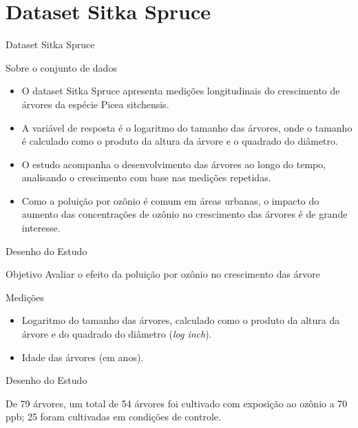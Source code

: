 \section{Dataset Sitka Spruce}
\begin{frame}{Dataset Sitka Spruce}
	\begin{block}{Sobre o conjunto de dados}
		\begin{itemize}
			\justifying
			\item O dataset Sitka Spruce apresenta medições longitudinais do crescimento de árvores da espécie Picea sitchensis.
			\item A variável de resposta é o logaritmo do tamanho das árvores, onde o tamanho é calculado como o produto da altura da árvore e o quadrado do diâmetro.
			\item O estudo acompanha o desenvolvimento das árvores ao longo do tempo, analisando o crescimento com base nas medições repetidas.
			\item Como a poluição por ozônio é comum em áreas urbanas, o impacto
			do aumento das concentrações de ozônio no crescimento das árvores
			é de grande interesse.
		\end{itemize}
	\end{block}
\end{frame}

\begin{frame}{Desenho do Estudo}
	\begin{block}{Objetivo}
		Avaliar o efeito da poluição por ozônio no crescimento das árvore
	\end{block}
	\begin{block}{Medições}
		\begin{itemize}
			\item Logaritmo do tamanho das árvores, calculado como o produto da altura da árvore e do quadrado do diâmetro (\textit{log inch}).
			\item Idade das árvores (em anos).
		\end{itemize}
	\end{block}
\end{frame}

\begin{frame}{Desenho do Estudo}
	\begin{block}{}
		De 79 árvores, um total de 54 árvores foi cultivado com exposição ao
		ozônio a 70 ppb; 25 foram cultivadas em condições de controle.
	\end{block}
\end{frame}

